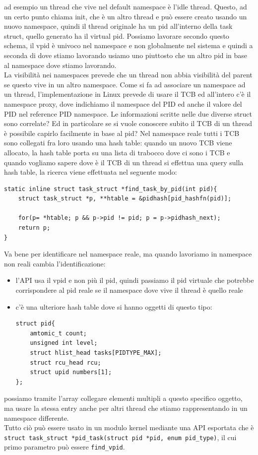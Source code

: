 \documentclass[12pt, oneside]{extbook}
\begin{document}
ad esempio un thread che vive nel default namespace è l'idle thread. Questo, ad un certo punto chiama init, che è un altro thread e può essere creato usando un nuovo namespace, quindi il thread originale ha un pid all'interno della task struct, quello generato ha il virtual pid. Possiamo lavorare secondo questo schema, il vpid è univoco nel namespace e non globalmente nel sistema e quindi a seconda di dove stiamo lavorando usiamo uno piuttosto che un altro pid in base al namespace dove stiamo lavorando.\\La visibilità nei namespaces prevede che un thread non abbia visibilità del parent se questo vive in un altro namespace. Come si fa ad associare un namespace ad un thread, l'implementazione in Linux prevede di usare il TCB ed all'intero c'è il namespace proxy, dove indichiamo il namespace del PID ed anche il valore del PID nel reference PID namespace. Le informazioni scritte nelle due diverse struct sono correlate? Ed in particolare se si vuole conoscere subito il TCB di un thread è possibile capirlo facilmente in base al pid? Nel namespace reale tutti i TCB sono collegati fra loro usando una hash table: quando un nuovo TCB viene allocato, la hash table porta su una lista di trabocco dove ci sono i TCB e quando vogliamo sapere dove è il TCB di un thread si effettua una query sulla hash table, la ricerca viene effettuata nel seguente modo:
\begin{lstlisting}
static inline struct task_struct *find_task_by_pid(int pid){
	struct task_struct *p, **htable = &pidhash[pid_hashfn(pid)];
	
	for(p= *htable; p && p->pid != pid; p = p->pidhash_next);
	return p;
}
\end{lstlisting}
Va bene per identificare nel namespace reale, ma quando lavoriamo in namespace non reali cambia l'identificazione:
\begin{itemize}
\item l'API usa il vpid e non più il pid, quindi passiamo il pid virtuale che potrebbe corrispondere al pid reale se il namespace dove vive il thread è quello reale
\item c'è una ulteriore hash table dove si hanno oggetti di questo tipo:
\begin{lstlisting}
struct pid{
	amtomic_t count;
	unsigned int level;
	struct hlist_head tasks[PIDTYPE_MAX];
	struct rcu_head rcu;
	struct upid numbers[1];
};
\end{lstlisting}
\end{itemize}
possiamo tramite l'array collegare elementi multipli a questo specifico oggetto, ma usare la stessa entry anche per altri thread che stiamo rappresentando in un namespace differente.\\Tutto ciò può essere usato in un modulo kernel mediante una API esportata che è \texttt{struct task\_struct *pid\_task(struct pid *pid, enum pid\_type)}, il cui primo parametro può essere \texttt{find\_vpid}.
\end{document}

